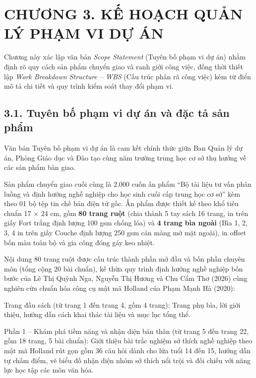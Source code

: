 \section*{CHƯƠNG 3. KẾ HOẠCH QUẢN LÝ PHẠM VI DỰ ÁN}

Chương này xác lập văn bản \textit{Scope Statement} (Tuyên bố phạm vi dự án) nhằm định rõ quy cách sản phẩm chuyển giao và ranh giới công việc, đồng thời thiết lập \textit{Work Breakdown Structure -- WBS} (Cấu trúc phân rã công việc) kèm từ điển mô tả chi tiết và quy trình kiểm soát thay đổi phạm vi.

\subsection*{3.1. Tuyên bố phạm vi dự án và đặc tả sản phẩm}

Văn bản Tuyên bố phạm vi dự án là cam kết chính thức giữa Ban Quản lý dự án, Phòng Giáo dục và Đào tạo cùng năm trường trung học cơ sở thụ hưởng về các sản phẩm bàn giao.

Sản phẩm chuyển giao cuối cùng là 2.000 cuốn ấn phẩm ``Bộ tài liệu tư vấn phân luồng và định hướng nghề nghiệp cho học sinh cuối cấp trung học cơ sở'' kèm theo 01 bộ tệp tin chế bản điện tử gốc. Ấn phẩm được thiết kế theo khổ tiêu chuẩn 17 $\times$ 24 cm, gồm \textbf{80 trang ruột} (chia thành 5 tay sách 16 trang, in trên giấy Fort trắng định lượng 100 gsm chống lóa) và \textbf{4 trang bìa ngoài} (Bìa 1, 2, 3, 4 in trên giấy Couche định lượng 250 gsm cán màng mờ mặt ngoài), in offset bốn màu toàn bộ và gia công đóng gáy keo nhiệt.

Nội dung 80 trang ruột được cấu trúc thành phần mở đầu và bốn phần chuyên môn (tổng cộng 20 bài chuẩn), kế thừa quy trình định hướng nghề nghiệp bốn bước của Lê Thị Quỳnh Nga, Nguyễn Thị Hương và Chu Cẩm Thơ (2026) cùng nghiên cứu chuẩn hóa công cụ mật mã Holland của Phạm Mạnh Hà (2020):

Trang đầu sách (từ trang 1 đến trang 4, gồm 4 trang): Trang phụ bìa, lời giới thiệu, hướng dẫn cách khai thác tài liệu và mục lục tổng thể.

Phần 1 -- Khám phá tiềm năng và nhận diện bản thân (từ trang 5 đến trang 22, gồm 18 trang, 5 bài chuẩn): Giới thiệu bài trắc nghiệm sở thích nghề nghiệp theo mật mã Holland rút gọn gồm 36 câu hỏi dành cho lứa tuổi 14 đến 15, hướng dẫn tự chấm điểm, vẽ biểu đồ nhận diện nhóm sở thích nổi trội và đối chiếu với năng lực học tập các môn văn hóa.

